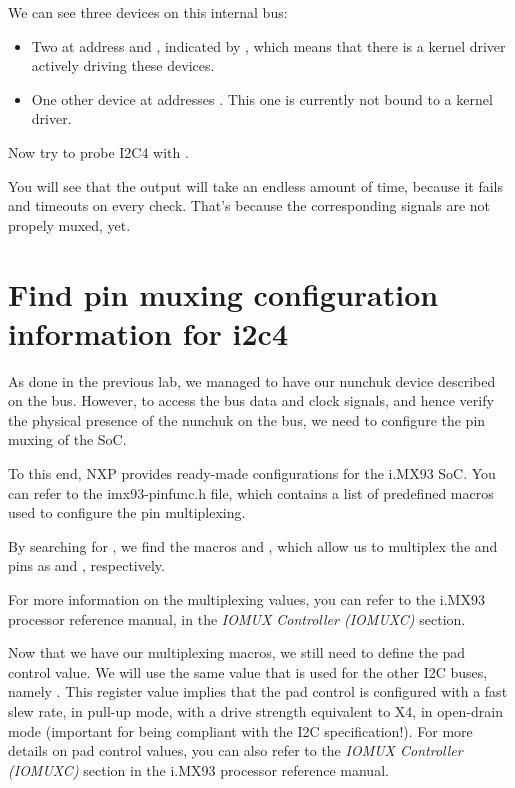 We can see three devices on this internal bus:
\begin{itemize}
\item Two at address  and , indicated by ,
      which means that there is a kernel driver actively
      driving these devices.
\item One other device at addresses .
      This one is currently not bound to a kernel driver.
\end{itemize}

Now try to probe I2C4 with .

You will see that the output will take an endless amount of time, because it
fails and timeouts on every check. That's because the corresponding signals are
not propely muxed, yet.

\section{Find pin muxing configuration information for i2c4}

As done in the previous lab, we managed to have our nunchuk
device described on the  bus. However, to access the bus data and
clock signals, and hence verify the physical presence of the nunchuk on the bus,
we need to configure the pin muxing of the SoC.

To this end, NXP provides ready-made configurations for the i.MX93 SoC.  You can
refer to the imx93-pinfunc.h file, which contains a list of predefined macros
used to configure the pin multiplexing.

By searching for , we find the
macros 
and , which allow us to multiplex
the  and  pins as 
and , respectively.

For more information on the multiplexing values, you can refer to the i.MX93
processor reference manual, in the {\em IOMUX Controller (IOMUXC)} section.

Now that we have our multiplexing macros, we still need to define the pad
control value. We will use the same value that is used for the other I2C buses,
namely . This register value implies that the pad control is
configured with a fast slew rate, in pull-up mode, with a drive strength
equivalent to X4, in open-drain mode (important for being compliant with the I2C
specification!). For more details on pad control values, you can also refer to
the {\em IOMUX Controller (IOMUXC)} section in the i.MX93 processor reference
manual.

